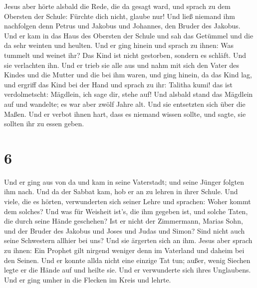  Jesus aber hörte alsbald die Rede, die da gesagt ward,
und sprach zu dem Obersten der Schule: Fürchte dich nicht, glaube nur!
 Und ließ niemand ihm nachfolgen denn Petrus und Jakobus
und Johannes, den Bruder des Jakobus.  Und er kam in das
Haus des Obersten der Schule und sah das Getümmel und die da sehr
weinten und heulten.  Und er ging hinein und sprach zu
ihnen: Was tummelt und weinet ihr? Das Kind ist nicht gestorben, sondern
es schläft. Und sie verlachten ihn.  Und er trieb sie
alle aus und nahm mit sich den Vater des Kindes und die Mutter und die
bei ihm waren, und ging hinein, da das Kind lag,  und
ergriff das Kind bei der Hand und sprach zu ihr: Talitha kumi! das ist
verdolmetscht: Mägdlein, ich sage dir, stehe auf!  Und
alsbald stand das Mägdlein auf und wandelte; es war aber zwölf Jahre
alt. Und sie entsetzten sich über die Maßen.  Und er
verbot ihnen hart, dass es niemand wissen sollte, und sagte, sie sollten
ihr zu essen geben.

\hypertarget{section-5}{%
\section{6}\label{section-5}}

 Und er ging aus von da und kam in seine Vaterstadt; und
seine Jünger folgten ihm nach.  Und da der Sabbat kam, hob
er an zu lehren in ihrer Schule. Und viele, die es hörten, verwunderten
sich seiner Lehre und sprachen: Woher kommt dem solches? Und was für
Weisheit ist's, die ihm gegeben ist, und solche Taten, die durch seine
Hände geschehen?  Ist er nicht der Zimmermann, Marias
Sohn, und der Bruder des Jakobus und Joses und Judas und Simon? Sind
nicht auch seine Schwestern allhier bei uns? Und sie ärgerten sich an
ihm.  Jesus aber sprach zu ihnen: Ein Prophet gilt nirgend
weniger denn im Vaterland und daheim bei den Seinen.  Und
er konnte allda nicht eine einzige Tat tun; außer, wenig Siechen legte
er die Hände auf und heilte sie.  Und er verwunderte sich
ihres Unglaubens. Und er ging umher in die Flecken im Kreis und lehrte.


